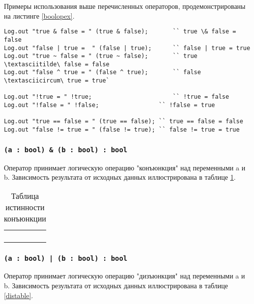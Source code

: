 Примеры использования выше перечисленных операторов, продемонстрированы на листинге \ref{boolopex}.

\begin{lstlisting}[caption=Примеры использования операторов над данными типа bool, label=boolopex]
Log.out "true & false = " (true & false);		`` true \& false = false
Log.out "false | true =  " (false | true);		`` false | true = true
Log.out "true ~ false = " (true ~ false);		`` true \textasciitilde\ false = false
Log.out "false ^ true = " (false ^ true);		`` false \textasciicircum\ true = true`

Log.out "!true = " !true;						`` !true = false
Log.out "!false = " !false;					`` !false = true

Log.out "true == false = " (true == false);	`` true == false = false
Log.out "false != true = " (false != true);	`` false != true = true
\end{lstlisting}

\subsubsection{\lstinline|(a : bool) & (b : bool) : bool|}

Оператор принимает логическую операцию "конъюнкция" над переменными a и b. Зависимость результата от исходных данных иллюстрирована в таблице \ref{conjtable}.

\begin{table}[htb]
	\caption{Таблица истинности конъюнкции}
	\label{conjtable}
	\begin{tabular}{|c|c|c|}
		\hline
		\code{a} & \code{b} & \code{a \& b} \\ \hline
		\false{} & \false{} & \false{}  	\\ \hline
		\false{} & \true{}  & \false{}  	\\ \hline
		\true{}  & \false{} & \false{}  	\\ \hline
		\true{}  & \true{}  & \true{}   	\\ \hline
	\end{tabular}
	\vspace{-2em}
\end{table}

\subsubsection{\lstinline`(a : bool) | (b : bool) : bool`}

Оператор принимает логическую операцию "дизъюнкция" над переменными a и b. Зависимость результата от исходных данных иллюстрирована в таблице \ref{distable}.

